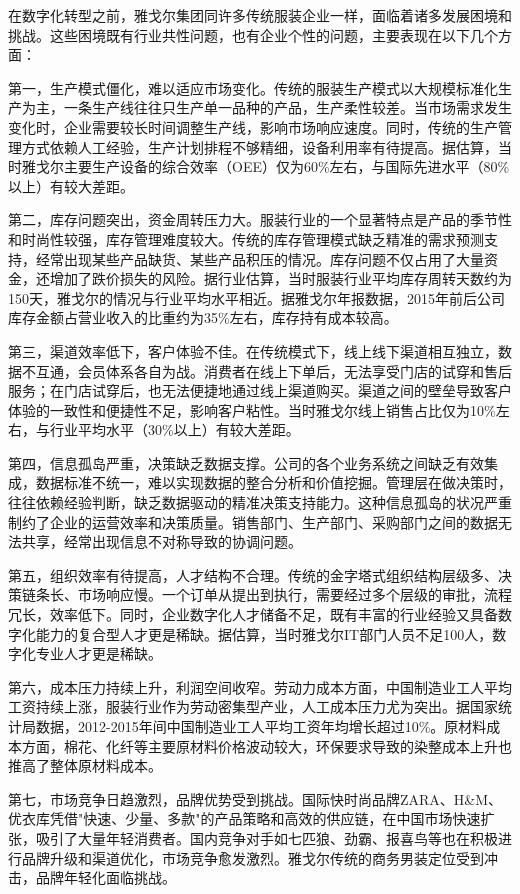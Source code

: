 \documentclass[12pt,a4paper]{article}
\begin{document}
在数字化转型之前，雅戈尔集团同许多传统服装企业一样，面临着诸多发展困境和挑战。这些困境既有行业共性问题，也有企业个性的问题，主要表现在以下几个方面：

第一，生产模式僵化，难以适应市场变化。传统的服装生产模式以大规模标准化生产为主，一条生产线往往只生产单一品种的产品，生产柔性较差。当市场需求发生变化时，企业需要较长时间调整生产线，影响市场响应速度。同时，传统的生产管理方式依赖人工经验，生产计划排程不够精细，设备利用率有待提高。据估算，当时雅戈尔主要生产设备的综合效率（OEE）仅为60\%左右，与国际先进水平（80\%以上）有较大差距。

第二，库存问题突出，资金周转压力大。服装行业的一个显著特点是产品的季节性和时尚性较强，库存管理难度较大。传统的库存管理模式缺乏精准的需求预测支持，经常出现某些产品缺货、某些产品积压的情况。库存问题不仅占用了大量资金，还增加了跌价损失的风险。据行业估算，当时服装行业平均库存周转天数约为150天，雅戈尔的情况与行业平均水平相近。据雅戈尔年报数据，2015年前后公司库存金额占营业收入的比重约为35\%左右，库存持有成本较高。

第三，渠道效率低下，客户体验不佳。在传统模式下，线上线下渠道相互独立，数据不互通，会员体系各自为战。消费者在线上下单后，无法享受门店的试穿和售后服务；在门店试穿后，也无法便捷地通过线上渠道购买。渠道之间的壁垒导致客户体验的一致性和便捷性不足，影响客户粘性。当时雅戈尔线上销售占比仅为10\%左右，与行业平均水平（30\%以上）有较大差距。

第四，信息孤岛严重，决策缺乏数据支撑。公司的各个业务系统之间缺乏有效集成，数据标准不统一，难以实现数据的整合分析和价值挖掘。管理层在做决策时，往往依赖经验判断，缺乏数据驱动的精准决策支持能力。这种信息孤岛的状况严重制约了企业的运营效率和决策质量。销售部门、生产部门、采购部门之间的数据无法共享，经常出现信息不对称导致的协调问题。

第五，组织效率有待提高，人才结构不合理。传统的金字塔式组织结构层级多、决策链条长、市场响应慢。一个订单从提出到执行，需要经过多个层级的审批，流程冗长，效率低下。同时，企业数字化人才储备不足，既有丰富的行业经验又具备数字化能力的复合型人才更是稀缺。据估算，当时雅戈尔IT部门人员不足100人，数字化专业人才更是稀缺。

第六，成本压力持续上升，利润空间收窄。劳动力成本方面，中国制造业工人平均工资持续上涨，服装行业作为劳动密集型产业，人工成本压力尤为突出。据国家统计局数据，2012-2015年间中国制造业工人平均工资年均增长超过10\%。原材料成本方面，棉花、化纤等主要原材料价格波动较大，环保要求导致的染整成本上升也推高了整体原材料成本。

第七，市场竞争日趋激烈，品牌优势受到挑战。国际快时尚品牌ZARA、H\&M、优衣库凭借"快速、少量、多款"的产品策略和高效的供应链，在中国市场快速扩张，吸引了大量年轻消费者。国内竞争对手如七匹狼、劲霸、报喜鸟等也在积极进行品牌升级和渠道优化，市场竞争愈发激烈。雅戈尔传统的商务男装定位受到冲击，品牌年轻化面临挑战。
\end{document}
